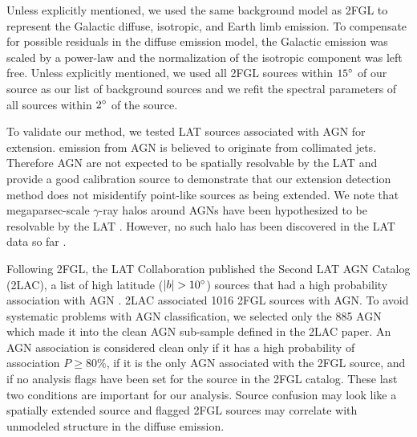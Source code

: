 Unless explicitly
mentioned, we used the same background model as 2FGL to represent the
Galactic diffuse, isotropic, and Earth limb emission.  To compensate for
possible residuals in the diffuse emission model, the Galactic emission
was scaled by a power-law and the normalization
of the isotropic component
was left free.  
Unless explicitly mentioned,
we used all 2FGL sources within $15^\circ$ of our source as our list
of background sources and we refit the spectral parameters of all sources
within $2^\circ$ of the source.



To validate our method, we tested LAT sources associated with AGN for
extension.  \gev emission from AGN is believed to originate from collimated jets.  Therefore AGN are
not expected to be spatially resolvable by the LAT and provide a good
calibration source to demonstrate that our extension detection method
does not misidentify point-like sources as being extended.  We note that
megaparsec-scale $\gamma$-ray halos around AGNs have been hypothesized
to be resolvable by the LAT \citep{aharonian_1994a_energy-gamma}. However, no such
halo has been discovered in the LAT data so far \citep{neronov_2011a_evidence-gamma-ray}.

Following 2FGL, the LAT Collaboration published the Second LAT AGN
Catalog (2LAC), a list of high latitude ($|b|>10\degree$) sources
that had a high probability association with AGN \citep{ackermann_2011a_second-catalog}.
2LAC associated 1016 2FGL sources with AGN.  To avoid systematic problems
with AGN classification, we selected only the 885 AGN which made it into
the clean AGN sub-sample defined in the 2LAC paper.  An AGN association is considered clean only
if it has a high probability of association $P\ge 80\%$, if it is the
only AGN associated with the 2FGL source, and if 
no analysis flags have been set for the source
in the 2FGL catalog. These last two conditions are important for our
analysis. Source confusion may look like a spatially extended source
and flagged 2FGL sources may correlate with unmodeled structure in
the diffuse emission.

